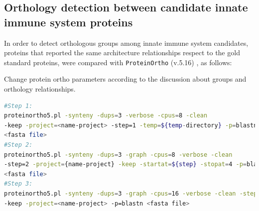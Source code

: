 \documentclass[11pt]{article}
\newcommand{\TODO}[1]{\begingroup\color{red}#1\endgroup}
\begin{document}


\subsection*{Orthology detection between candidate innate immune system 
proteins}
In order to detect orthologous groups among innate immune system candidates, 
proteins that reported the same architecture relationships respect to the gold 
standard proteins, were compared with \texttt{ProteinOrtho} 
(v.5.16) \cite{Lechner2011}, as follows:

\TODO{Change protein ortho parameters according to the discussion about groups 
and orthology relationships.}
\begin{lstlisting}[language=bash, breaklines=true]
#Step 1:
proteinortho5.pl -synteny -dups=3 -verbose -cpus=8 -clean 
-keep -project=<name-project> -step=1 -temp=${temp-directory} -p=blastn 
<fasta file>
#Step 2:
proteinortho5.pl -synteny -dups=3 -graph -cpus=8 -verbose -clean 
-step=2 -project={name-project} -keep -startat=${step} -stopat=4 -p=blastn 
<fasta file>
#Step 3:
proteinortho5.pl -synteny -dups=3 -graph -cpus=16 -verbose -clean -step=3 
-keep -project=<name-project> -p=blastn <fasta file>
\end{lstlisting}
\end{document}
